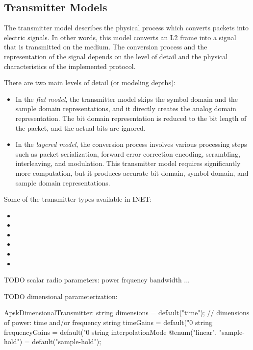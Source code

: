 \subsection{Transmitter Models}
\label{sec:phy:transmitter-models}

The transmitter model describes the physical process which converts packets into
electric signals. In other words, this model converts an L2 frame into a signal
that is transmitted on the medium. The conversion process and the representation
of the signal depends on the level of detail and the physical characteristics
of the implemented protocol.

There are two main levels of detail (or modeling depths):

\begin{itemize}
\item In the \textit{flat model}, the transmitter model skips the symbol domain
and the sample domain representations, and it directly creates the analog domain
representation. The bit domain representation is reduced to the bit length of
the packet, and the actual bits are ignored.
\item In the \textit{layered model}, the conversion process involves various
processing steps such as packet serialization, forward error correction encoding,
scrambling, interleaving, and modulation. This transmitter model requires
significantly more computation, but it produces accurate bit domain,
symbol domain, and sample domain representations.
\end{itemize}

Some of the transmitter types available in INET:

\begin{itemize}
  \item {}
  \item {}
  \item {}
  \item {}
  \item {}
  \item {}
\end{itemize}

TODO scalar radio parameters:
    power
    frquency
    bandwidth
    ...

TODO dimensional parameterization: 

 ApskDimensionalTransmitter:
        string dimensions = default("time");                // dimensions of power: time and/or frequency
        string timeGains = default("0%
        string frequencyGains = default("0%
        string interpolationMode @enum("linear", "sample-hold") = default("sample-hold");


